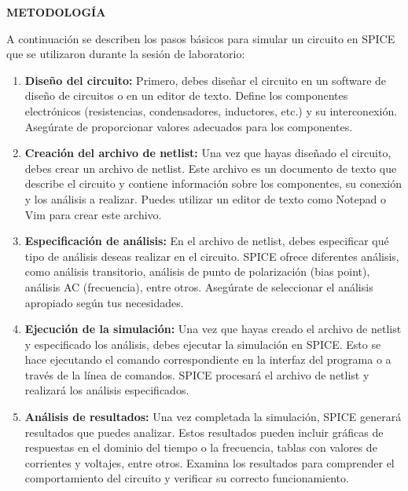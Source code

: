 \documentclass[12pt]{article}
\begin{document}
	\newpage
	
	\begin{center}
		\textbf{\large METODOLOGÍA}\\
	\end{center}

	A continuación se describen los pasos básicos para simular un circuito en SPICE que se utilizaron durante la sesión de laboratorio:
	
	\begin{enumerate}
		\item \textbf{Diseño del circuito:} Primero, debes diseñar el circuito en un software de diseño de circuitos o en un editor de texto. Define los componentes electrónicos (resistencias, condensadores, inductores, etc.) y su interconexión. Asegúrate de proporcionar valores adecuados para los componentes.
		
		\item \textbf{Creación del archivo de netlist:} Una vez que hayas diseñado el circuito, debes crear un archivo de netlist. Este archivo es un documento de texto que describe el circuito y contiene información sobre los componentes, su conexión y los análisis a realizar. Puedes utilizar un editor de texto como Notepad o Vim para crear este archivo.
		
		\item \textbf{Especificación de análisis:} En el archivo de netlist, debes especificar qué tipo de análisis deseas realizar en el circuito. SPICE ofrece diferentes análisis, como análisis transitorio, análisis de punto de polarización (bias point), análisis AC (frecuencia), entre otros. Asegúrate de seleccionar el análisis apropiado según tus necesidades.
		
		\item \textbf{Ejecución de la simulación:} Una vez que hayas creado el archivo de netlist y especificado los análisis, debes ejecutar la simulación en SPICE. Esto se hace ejecutando el comando correspondiente en la interfaz del programa o a través de la línea de comandos. SPICE procesará el archivo de netlist y realizará los análisis especificados.
		
		\item \textbf{Análisis de resultados:} Una vez completada la simulación, SPICE generará resultados que puedes analizar. Estos resultados pueden incluir gráficas de respuestas en el dominio del tiempo o la frecuencia, tablas con valores de corrientes y voltajes, entre otros. Examina los resultados para comprender el comportamiento del circuito y verificar su correcto funcionamiento.\\
	\end{enumerate}
	
\end{document}
